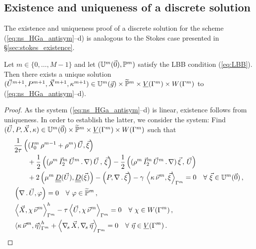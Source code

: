 \subsection{Existence and uniqueness of a discrete solution}
\label{sec:ns_existence}
The existence and uniqueness proof of a discrete solution for the scheme
(\ref{eq:ns_HGa_antisym}--d) is analogous to the Stokes case presented in
\S\ref{sec:stokes_existence}.
\begin{theorem} \label{thm:ns_ex}
Let $m \in \{0,\ldots,M-1\}$ and let $(\uspacedisc{0}{m},\pspace^m)$ satisfy
the LBB condition (\ref{eq:LBB}). Then there exists a unique solution
$(\vec U^{m+1}, P^{m+1}, \vec X^{m+1}, \kappa^{m+1})
\in \uspacedisc{g}{m}\times \pnormspace^m \times \Vh \times \Wh$ to
(\ref{eq:ns_HGa_antisym}--d).
\end{theorem}
\begin{proof}
\sloppy As the system (\ref{eq:ns_HGa_antisym}--d) is linear, existence follows
from uniqueness. In order to establish the latter, we consider the system: Find
${(\vec U, P, \vec X, \kappa) \in \uspacedisc{0}{m}\times\pnormspace^m \times
\Vh \times \Wh}$ such that
\begin{subequations}
\begin{align}
& \frac{1}{2\tau}\left((I^m_0\,\rho^{m-1}+\rho^m)\,\vec U, \vec \xi
\right)\nonumber \\
& \qquad + \frac{1}{2}\left((\rho^m\,\vec I^m_2\,\vec U^m\,.\,\nabla)\,
\vec U\,,\,\vec \xi \right) - \frac{1}{2} \left((\rho^m\,
\vec I^m_2 \, \vec U^m\,.\,\nabla)\,\vec \xi\,,\,\vec U \right) \nonumber \\
& \qquad + 2\left(\mu^m\,\mat D(\vec U), \mat D(\vec \xi) \right)
- \left(P, \nabla\,.\,\vec \xi\right) - \gamma\,\left\langle \kappa\,\vec\nu^m,
\vec\xi\right\rangle_{\Gamma^m} = 0 \quad \forall\ \vec\xi \in
\uspacedisc{0}{m} \,, \label{eq:ns_proofa}\\
& \left(\nabla\,.\,\vec U, \varphi\right)  = 0 \quad
\forall\ \varphi \in \pnormspace^m\,, \label{eq:ns_proofb} \\
& \left\langle \vec X, \chi\,\vec\nu^m \right\rangle_{\Gamma^m}^h -
\tau \left\langle \vec U, \chi\,\vec\nu^m \right\rangle_{\Gamma^m} = 0
\quad\forall\ \chi \in \Wh\,,\label{eq:ns_proofc} \\
& \left\langle \kappa\,\vec\nu^m, \vec\eta \right\rangle_{\Gamma^m}^h
+ \left\langle \nabs\,\vec X, \nabs\,\vec \eta \right\rangle_{\Gamma^m}
= 0  \quad\forall\ \vec\eta \in \Vh\,. \label{eq:ns_proofd}
\end{align}
\end{subequations}

\end{proof}
